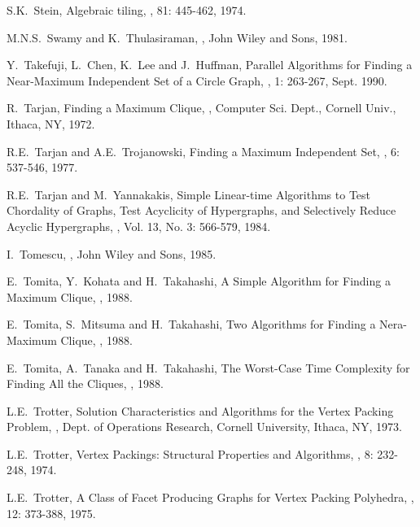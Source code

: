 \begin{thebibliography}{10}
S.K.~Stein,
\newblock Algebraic tiling,
, 81: 445-462, 1974.

M.N.S.~Swamy and K.~Thulasiraman,
,
\newblock John Wiley and Sons, 1981.

Y.~Takefuji, L.~Chen, K.~Lee and J.~Huffman,
\newblock Parallel Algorithms for Finding a Near-Maximum Independent
Set of a Circle Graph,
, 1: 263-267,
Sept. 1990.

R.~Tarjan,
\newblock Finding a Maximum Clique,
, Computer Sci. Dept., Cornell
Univ., Ithaca, NY, 1972.

R.E.~Tarjan and A.E.~Trojanowski,
\newblock Finding a Maximum Independent Set,
, 6: 537-546, 1977.

R.E.~Tarjan and M.~Yannakakis,
\newblock Simple Linear-time Algorithms to Test Chordality of
Graphs, Test Acyclicity of Hypergraphs, and Selectively Reduce
Acyclic Hypergraphs,
, Vol. 13, No. 3: 566-579, 1984.

I.~Tomescu,
,
\newblock John Wiley and Sons, 1985.

E.~Tomita, Y.~Kohata and H.~Takahashi,
\newblock A Simple Algorithm for Finding a Maximum Clique,
, 1988.

E.~Tomita, S.~Mitsuma and H.~Takahashi,
\newblock Two Algorithms for Finding a Nera-Maximum Clique,
, 1988.

E.~Tomita, A.~Tanaka and H.~Takahashi,
\newblock The Worst-Case Time Complexity for Finding All the Cliques,
, 1988.

L.E.~Trotter,
\newblock Solution Characteristics and Algorithms for the Vertex
Packing Problem,
, Dept. of Operations Research,
Cornell University, Ithaca, NY, 1973.

L.E.~Trotter,
\newblock Vertex Packings: Structural Properties and Algorithms,
, 8: 232-248, 1974.

L.E.~Trotter,
\newblock A Class of Facet Producing Graphs for Vertex Packing
Polyhedra,
, 12: 373-388, 1975.


\end{thebibliography}
